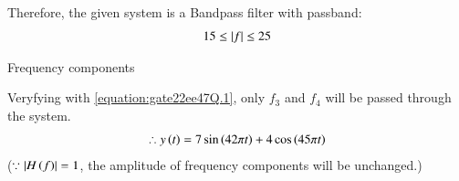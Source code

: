 \documentclass[journal,12pt,twocolumn]{IEEEtran}
\theoremstyle{remark}
\begin{document}
Therefore, the given system is a Bandpass filter with passband: \\
\begin{align}
    15\leq\left\vert f\right\vert\leq 25    \label{equation:gate22ee47Q.1}
\end{align}
\begin{table}[ht]
    \centering
    
    \caption{Frequency components}
    \label{tab:gate22ee47Q.1}
\end{table}
Veryfying  with \eqref{equation:gate22ee47Q.1}, only $f_3$ and $f_4$ will be passed through the system. \\
\begin{align}
    \therefore y\left(t\right)=7\sin\left(42\pi t\right)+4\cos\left(45\pi t\right)
\end{align}
($\because\left\vert H\left(f\right)\right\vert=1$, the amplitude of frequency components will be unchanged.)
\end{document}
